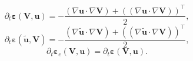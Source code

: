 \documentclass[preview]{standalone}
\let\oldcdot\cdot
\let\cdot\oldcdot
\begin{document}
\begin{dmath*}
\partial_{t} \bm\varepsilon({\mathbf V},{\mathbf{ u }}) = - \frac{\left(  \nabla {\mathbf{ u }}  \cdot  \nabla {\mathbf V}  \right) +  \left( \left(  \nabla {\mathbf{ u }}  \cdot  \nabla {\mathbf V}  \right) \right)^\top }{2},
 \end{dmath*}
\begin{dmath*}
\partial_{t} \pmb\varepsilon(\tilde{\mathbf{ u }},{\mathbf V}) = - \frac{\left(  \nabla \tilde{\mathbf{ u }}  \cdot  \nabla {\mathbf V}  \right) +  \left( \left(  \nabla \tilde{\mathbf{ u }}  \cdot  \nabla {\mathbf V}  \right) \right)^\top }{2},
 \end{dmath*}
\begin{dmath*}
\partial_{t} \pmb\varepsilon_e({\mathbf V},{\mathbf{ u }}) = \partial_{t} \bm\varepsilon({\mathbf V},{\mathbf{ u }}).
 \end{dmath*}
\end{document}
